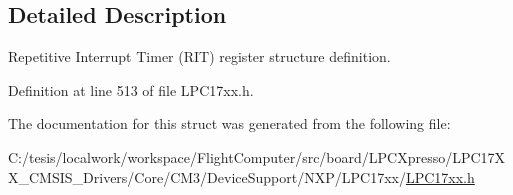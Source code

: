 \subsection{\-Detailed \-Description}
\-Repetitive \-Interrupt \-Timer (\-R\-I\-T) register structure definition. 

\-Definition at line 513 of file \-L\-P\-C17xx.\-h.



\-The documentation for this struct was generated from the following file\-:\begin{DoxyCompactItemize}
\item 
\-C\-:/tesis/localwork/workspace/\-Flight\-Computer/src/board/\-L\-P\-C\-Xpresso/\-L\-P\-C17\-X\-X\-\_\-\-C\-M\-S\-I\-S\-\_\-\-Drivers/\-Core/\-C\-M3/\-Device\-Support/\-N\-X\-P/\-L\-P\-C17xx/\hyperlink{_l_p_c17xx_8h}{\-L\-P\-C17xx.\-h}\end{DoxyCompactItemize}
